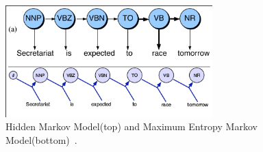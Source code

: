 \begin{figure}[ht]
\centering
\includegraphics[width=80mm]{figures/memm.png}
\caption{Hidden Markov Model(top) and Maximum Entropy Markov Model(bottom)~\cite{nlpBook}. \label{hmmVmemm}}
\end{figure}
